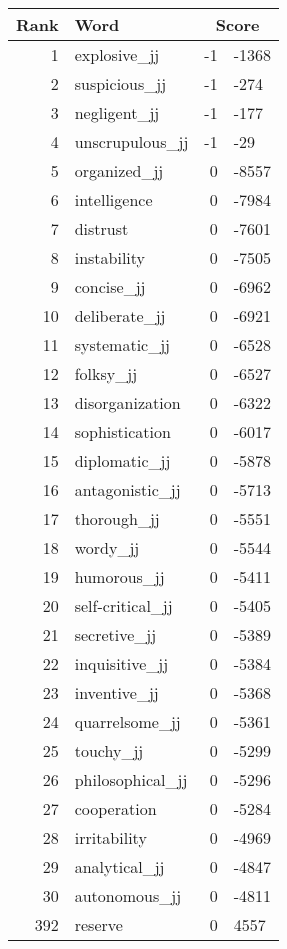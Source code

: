 \begin{longtable}[!htbp]{| rlr@{.}l |}
    \hline
    \textbf{Rank} & \textbf{Word} & \multicolumn{2}{c|}{\textbf{Score}} \\
    \hline
    \endhead
    1 & explosive\_jj & -1 & -1368 \\
    2 & suspicious\_jj & -1 & -274 \\
    3 & negligent\_jj & -1 & -177 \\
    4 & unscrupulous\_jj & -1 & -29 \\
    5 & organized\_jj & 0 & -8557 \\
    6 & intelligence & 0 & -7984 \\
    7 & distrust & 0 & -7601 \\
    8 & instability & 0 & -7505 \\
    9 & concise\_jj & 0 & -6962 \\
    10 & deliberate\_jj & 0 & -6921 \\
    11 & systematic\_jj & 0 & -6528 \\
    12 & folksy\_jj & 0 & -6527 \\
    13 & disorganization & 0 & -6322 \\
    14 & sophistication & 0 & -6017 \\
    15 & diplomatic\_jj & 0 & -5878 \\
    16 & antagonistic\_jj & 0 & -5713 \\
    17 & thorough\_jj & 0 & -5551 \\
    18 & wordy\_jj & 0 & -5544 \\
    19 & humorous\_jj & 0 & -5411 \\
    20 & self-critical\_jj & 0 & -5405 \\
    21 & secretive\_jj & 0 & -5389 \\
    22 & inquisitive\_jj & 0 & -5384 \\
    23 & inventive\_jj & 0 & -5368 \\
    24 & quarrelsome\_jj & 0 & -5361 \\
    25 & touchy\_jj & 0 & -5299 \\
    26 & philosophical\_jj & 0 & -5296 \\
    27 & cooperation & 0 & -5284 \\
    28 & irritability & 0 & -4969 \\
    29 & analytical\_jj & 0 & -4847 \\
    30 & autonomous\_jj & 0 & -4811 \\
    392 & reserve & 0 & 4557 \\

\end{longtable}
